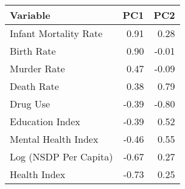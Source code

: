 
\begin{tabular}{lrr}
\toprule
Variable & PC1 & PC2\\
\midrule
Infant Mortality Rate & 0.91 & 0.28\\
Birth Rate & 0.90 & -0.01\\
Murder Rate & 0.47 & -0.09\\
Death Rate & 0.38 & 0.79\\
Drug Use & -0.39 & -0.80\\
\addlinespace
Education Index & -0.39 & 0.52\\
Mental Health Index & -0.46 & 0.55\\
Log (NSDP Per Capita) & -0.67 & 0.27\\
Health Index & -0.73 & 0.25\\
\bottomrule
\end{tabular}
